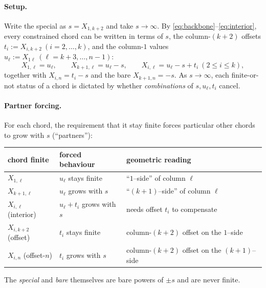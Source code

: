 \documentclass[11pt]{article}
\theoremstyle{definition}
\newcommand{\X}[1]{X_{#1}}
\begin{document}
\paragraph{Setup.}
Write the special as $s=\X{1,k+2}$ and take $s\to\infty$. By \eqref{eq:backbone}--\eqref{eq:interior},
every constrained chord can be written in terms of $s$, the column-$(k{+}2)$ offsets
$t_i:=\X{i,k+2}\ (i=2,\dots,k)$, and the column-$1$ values $u_\ell:=\X{1\ell}\ (\ell=k{+}3,\dots,n{-}1)$:
\begin{equation}\label{eq:column-formulas}
  \X{1,\ell}=u_\ell,\qquad
  \X{k+1,\ell}=u_\ell-s,\qquad
  \X{i,\ell}=u_\ell-s+t_i\ (2\le i\le k),
\end{equation}
together with $\X{i,n}=t_i-s$ and the bare $\X{k+1,n}=-s$. As $s\to\infty$, each finite-or-not
status of a chord is dictated by whether \emph{combinations} of $s,u_\ell,t_i$ cancel.

\paragraph{Partner forcing.}
For each chord, the requirement that it stay finite forces particular other chords to grow with $s$
(``partners''):
\begin{center}\small
\begin{tabular}{lll}
\toprule
chord finite & forced behaviour & geometric reading\\
\midrule
$\X{1,\ell}$            & $u_\ell$ stays finite                 & ``$1$--side'' of column $\ell$ \\
$\X{k+1,\ell}$          & $u_\ell$ grows with $s$               & ``$(k{+}1)$--side'' of column $\ell$ \\
$\X{i,\ell}$ (interior) & $u_\ell+t_i$ grows with $s$           & needs offset $t_i$ to compensate \\
$\X{i,k+2}$ (offset)    & $t_i$ stays finite                    & column-$(k{+}2)$ offset on the $1$--side \\
$\X{i,n}$ (offset-$n$)  & $t_i$ grows with $s$                  & column-$(k{+}2)$ offset on the $(k{+}1)$--side \\
\bottomrule
\end{tabular}
\end{center}
The \emph{special} and \emph{bare} themselves are bare powers of $\pm s$ and are never finite.
\end{document}
